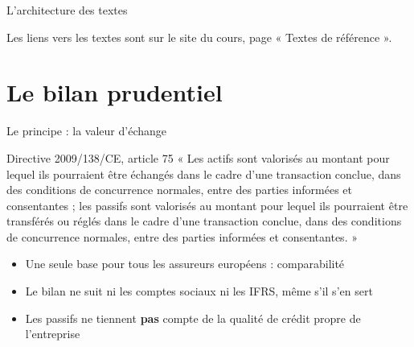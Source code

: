 \documentclass[10pt,aspectratio=169]{beamer}
\begin{document}
\begin{frame}{L'architecture des textes}
\begin{center}
\end{center}
\small Les liens vers les textes sont sur le site du cours, page « Textes de référence ».
\end{frame}

\section{Le bilan prudentiel}

\begin{frame}{Le principe : la valeur d'échange}
\begin{block}{Directive 2009/138/CE, article 75}
\small
« Les actifs sont valorisés au montant pour lequel ils pourraient être échangés dans le cadre d'une
transaction conclue, dans des conditions de concurrence normales, entre des parties informées et
consentantes ; les passifs sont valorisés au montant pour lequel ils pourraient être transférés ou
réglés dans le cadre d'une transaction conclue, dans des conditions de concurrence normales, entre
des parties informées et consentantes. »
\end{block}
\begin{itemize}
  \item Une seule base pour tous les assureurs européens : comparabilité
  \item Le bilan ne suit ni les comptes sociaux ni les IFRS, même s'il s'en sert
  \item Les passifs ne tiennent \textbf{pas} compte de la qualité de crédit propre de l'entreprise
\end{itemize}
\end{frame}
\end{document}
